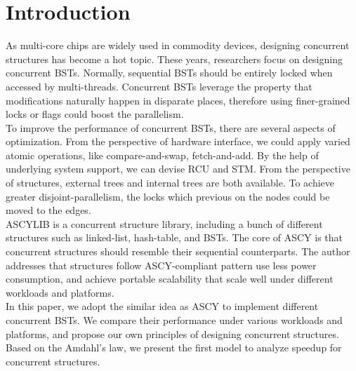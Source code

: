 \documentclass{article}
\begin{document}
\section{Introduction}
As multi-core chips are widely used in commodity devices, designing concurrent structures has become a hot topic. These years, researchers focus on designing concurrent BSTs. Normally, sequential BSTs should be entirely locked when accessed by multi-threads. Concurrent BSTs leverage the property that modifications naturally happen in disparate places, therefore using finer-grained locks or flags could boost the parallelism.\\
To improve the performance of concurrent BSTs, there are several aspects of optimization. From the perspective of hardware interface, we could apply varied atomic operations, like compare-and-swap\cite{valois1995lock}, fetch-and-add\cite{gottlieb1981coordinating}. By the help of underlying system support, we can devise RCU\cite{mckenney2001read} and STM\cite{shavit1997software}. From the perspective of structures, external trees and internal trees are both available. To achieve greater disjoint-parallelism\cite{hoare1976parallel}, the locks which previous on the nodes could be moved to the edges.\\
ASCYLIB\cite{david2015asynchronized} is a concurrent structure library, including a bunch of different structures such as linked-list, hash-table, and BSTs. The core of ASCY is that concurrent structures should resemble their sequential counterparts. The author addresses that structures follow ASCY-compliant pattern use less power consumption, and achieve portable scalability that scale well under different workloads and platforms.\\
In this paper, we adopt the similar idea as ASCY to implement different concurrent BSTs. We compare their performance under various workloads and platforms, and propose our own principles of designing concurrent structures. Based on the Amdahl's law\cite{hill2008amdahl}, we present the first model to analyze speedup for concurrent structures. 
\end{document}
